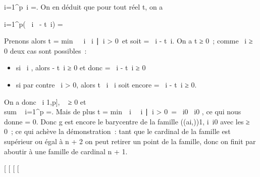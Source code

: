 i=1^p\lambda~i\overrightarrowgai
=. On en déduit que pour tout réel
t, on a

\sum i=1^p(\lambda~ i~ -
t\alpha~i)\overrightarrowgai
=

Prenons alors t = min~\
\lambda~i \over \alpha~i
∣\alpha~i \textgreater{}
0\ et soit \mui = \lambda~i - t\alpha~i.
On a t ≥ 0~; comme \lambda~i ≥ 0 deux cas sont possibles~:

\begin{itemize}
\itemsep1pt\parskip0pt
\item
  si \alpha~i , alors - t\alpha~i ≥ 0 et donc \mui =
  \lambda~i - t\alpha~i ≥ 0
\item
  si par contre \alpha~i \textgreater{} 0, alors t \leq \lambda~i
  \over \alpha~i soit encore \mui =
  \lambda~i - t\alpha~i ≥ 0.
\end{itemize}

On a donc \forall~i \in {[}1,p{]}, \mui~ ≥ 0 et
\\sum ~
i=1^p\mui\overrightarrowgai
=. Mais de plus t
= min\ \lambda~i~
\over \alpha~i
∣\alpha~i \textgreater{}
0\ = \lambda~i0 \over
\alpha~i0 , ce qui nous donne  =
0. Donc g est encore le barycentre de la famille \left
((ai,\mui)\right )1\leqi\leqp,
i\neq~i0 avec les \mui ≥ 0~;
ce qui achève la démonstration~: tant que le cardinal de la famille est
supérieur ou égal à n + 2 on peut retirer un point de la famille, donc
on finit par aboutir à une famille de cardinal n + 1.

{[}
{[}
{[}
{[}
